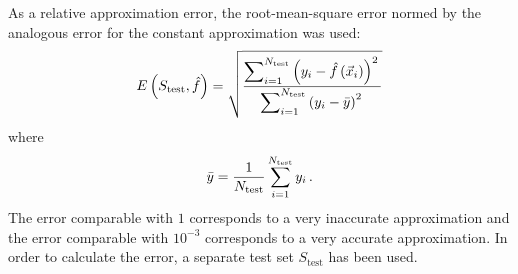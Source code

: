 \begin{multicols}{2}
As a relative approximation error, the root-mean-square error normed by the analogous 
error for the constant approximation was used:
\begin{equation}
  E\left(S_{\mathrm{test}}, \hat f\right) = 
  \sqrt{\displaystyle\frac{\displaystyle \sum\nolimits_{i=1}^{N_{\mathrm{test}}} 
  \left( y_i - \hat f \left( \vec x_i\right) \right)^2\mathstrut}{\displaystyle \sum\nolimits_{i=1}^{N_{\mathrm{test}}} 
  \left( y_i - \bar{y} \right)^2\mathstrut}}
    \label{errorDef}
  \end{equation}
  where
  \begin{equation*}
  \bar{y} = \displaystyle\frac{\displaystyle 1\mathstrut}{\displaystyle N_{\mathrm{test}}\mathstrut} \sum\limits_{i=1}^{N_{\mathrm{test}}} y_i\,.
\end{equation*}
The error comparable with $1$ corresponds to a very inaccurate approximation 
and the error comparable with $10^{-3}$ corresponds to a very accurate approximation.
In order to calculate the error, a separate test set $S_{\mathrm{test}}$ has been used.

\begin{figure*} %
\vspace*{1pt}
 \begin{center}
 \mbox{%
 \epsfxsize=162.923mm
 }
 \end{center}
 \vspace*{-6pt}
  \label{boxplot_init}
\end{figure*}


\end{multicols}
